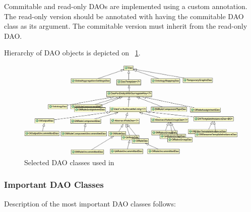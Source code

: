 Commitable and read-only DAOs are implemented using a custom  annotation. The read-only version should be annotated with  having the commitable DAO class as its argument. The commitable version must inherit from the read-only DAO.

Hierarchy of DAO objects is depicted on \figurename~\ref{fig:feDAO}.

\begin{figure}[htb]
    \centering
    \includegraphics[width=1.05\textwidth]{images/dia-fe-dao.png}
    \caption{Selected DAO classes used in \FE}
	\label{fig:feDAO}
\end{figure}

\subsubsection{Important DAO Classes}
Description of the most important DAO classes follows:


